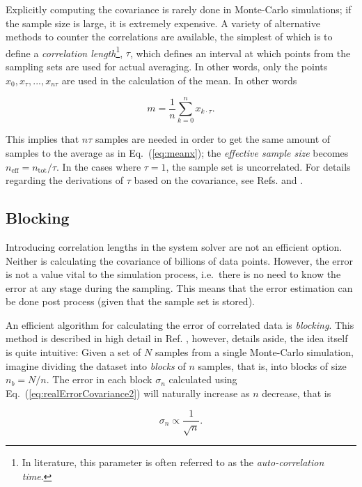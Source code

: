 Explicitly computing the covariance is rarely done in Monte-Carlo simulations; if the sample size is large, it is extremely expensive. A variety of alternative methods to counter the correlations are available, the simplest of which is to define a \textit{correlation length}\footnote{In literature, this parameter is often referred to as the \textit{auto-correlation time}.}, $\tau$, which defines an interval at which points from the sampling sets are used for actual averaging. In other words, only the points $x_0, x_{\tau}, ..., x_{n\tau}$ are used in the calculation of the mean. In other words

\begin{equation}
 m = \frac{1}{n}\sum_{k=0}^n x_{k\cdot\tau}.
\end{equation}

This implies that $n\tau$ samples are needed in order to get the same amount of samples to the average as in Eq.~(\ref{eq:meanx}); the \textit{effective sample size} becomes $n_\mathrm{eff} = n_\mathrm{tot}/\tau$. In the cases where $\tau = 1$, the sample set is uncorrelated. For details regarding the derivations of $\tau$ based on the covariance, see Refs. \cite{flyvbjerg:461} and \cite{morten}.

\subsection{Blocking}

Introducing correlation lengths in the system solver are not an efficient option. Neither is calculating the covariance of billions of data points. However, the error is not a value vital to the simulation process, i.e.~there is no need to know the error at any stage during the sampling. This means that the error estimation can be done post process (given that the sample set is stored).

An efficient algorithm for calculating the error of correlated data is \textit{blocking}. This method is described in high detail in Ref. \cite{flyvbjerg:461}, however, details aside, the idea itself is quite intuitive: Given a set of $N$ samples from a single Monte-Carlo simulation, imagine dividing the dataset into \textit{blocks} of $n$ samples, that is, into blocks of size $n_b=N/n$. The error in each block  $\sigma_n$ calculated using Eq.~(\ref{eq:realErrorCovariance2}) will naturally increase as $n$ decrease, that is

\begin{equation}
 \sigma_n \propto \frac{1}{\sqrt{n}}.
\end{equation}

